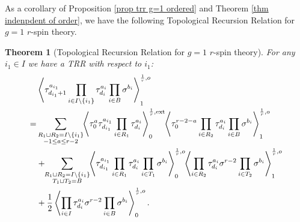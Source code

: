 \documentclass[11pt]{amsart}
\newtheorem{thm}[dummy]{Theorem}
\theoremstyle{definition}
\theoremstyle{remark}
\newcommand{\consta}{{\frac{1}{2}}}
\newcommand{\<}{\left<}
\renewcommand{\>}{\right>}
\numberwithin{equation}{section}
\begin{document}
As a corollary of Proposition \ref{prop trr g=1 ordered} and Theorem \ref{thm indenpdent of order}, we have the following Topological Recursion Relation for $g=1$ $r$-spin theory.
\begin{thm}[Topological Recursion Relation for $g=1$ $r$-spin theory]\label{thm trr g=1 unordered}
For any $i_1\in I$ we have a TRR with respect to $i_1$:
\begin{equation}\label{eq trr g=1 unordered}
\begin{split}
&\left\langle \tau_{d_{i_1}+1}^{a_{i_1}}\prod_{i\in I\setminus \{i_1\}}\tau^{a_i}_{d_i}\prod_{i\in B}\sigma^{b_i}\right\rangle^{\frac{1}{r},o}_1\hspace{-0.2cm}\\
=&\sum_{\substack{R_1 \sqcup R_2 = I\setminus\{i_1\}\\ -1\le a \le r-2}}\hspace{-0.1cm}\left\langle \tau_0^{a}\tau_{d_{i_1}}^{a_{i_1}}\prod_{i \in R_1}\tau_{d_i}^{a_i}\right\rangle^{\frac{1}{r},\text{ext}}_0
\hspace{-0.1cm}\left\langle \tau_0^{r-2-a}\prod_{i\in R_2}\tau^{a_i}_{d_i}\prod_{i\in B}\sigma^{b_i}\right\rangle^{\frac{1}{r},o}_1\\
&+\hspace{-0.1cm}\sum_{\substack{R_1 \sqcup R_2 =  I\setminus\{i_1\} \\ T_1 \sqcup T_2 =  B}} \hspace{-0.1cm} \left\langle \tau^{a_{i_1}}_{d_{i_1}}\prod_{i \in R_1} \tau^{a_i}_{d_i}\prod_{i\in T_1}\sigma^{b_i}\right\rangle^{\frac{1}{r},o}_0 \hspace{-0.1cm}\left\langle \prod_{i \in R_2} \tau^{a_i}_{d_i} \sigma^{r-2}\prod_{i\in T_2}\sigma^{b_i}\right\rangle^{\frac{1}{r}, o}_1\\
&+\consta\left\langle \prod_{i\in I}\tau^{a_i}_{d_i}\sigma^{r-2}\prod_{i\in B}\sigma^{b_i}\right\rangle^{\frac{1}{r},o}_0.
    \end{split}
\end{equation}
\end{thm}
\end{document}
